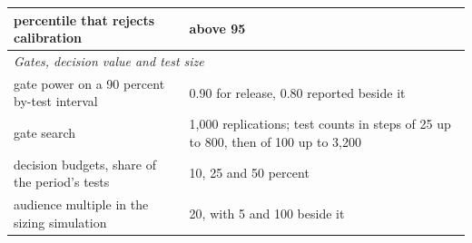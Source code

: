 \documentclass[sigconf,nonacm]{acmart}
\begin{document}
\begin{table}[t]
\begin{tabular}{p{}p{}}
percentile that rejects calibration & above 95 \\
\midrule
\multicolumn{2}{l}{\emph{Gates, decision value and test size}} \\
gate power on a 90 percent by-test interval & 0.90 for release, 0.80 reported beside it \\
gate search & 1,000 replications; test counts in steps of 25 up to 800, then of 100 up to 3,200 \\
decision budgets, share of the period's tests & 10, 25 and 50 percent \\
audience multiple in the sizing simulation & 20, with 5 and 100 beside it \\
\bottomrule
\end{tabular}
\end{table}
\end{document}
